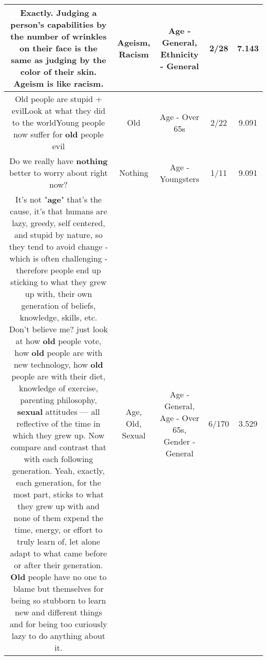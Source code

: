 \documentclass[11pt]{article}
\newlength\mylength
\begin{document}
\begin{center}
\begin{longtable}{|C{.65\mylength}|C{.30\mylength}|C{.12\mylength}|C{.12\mylength}|C{.12\mylength}|}
  \small Exactly.  Judging a person's capabilities by the number of wrinkles on their face is the same as judging by the color of their skin.  \textbf{Ageism} is like \textbf{racism}.\normalsize   & Ageism, Racism & Age - General, Ethnicity - General & 2/28 & 7.143 \\  \hline
  \small Old people are stupid + evilLook at what they did to the worldYoung people now suffer for \textbf{old} people evil\normalsize   & Old & Age - Over 65s & 2/22 & 9.091 \\  \hline
  \small Do we really have \textbf{nothing} better to worry about right now?\normalsize   & Nothing & Age - Youngsters & 1/11 & 9.091 \\  \hline
  \small It's not "\textbf{age}" that's the cause, it's that humans are lazy, greedy, self centered, and stupid by nature, so they tend to avoid change - which is often challenging - therefore people end up sticking to what they grew up with, their own generation of beliefs, knowledge, skills, etc. Don't believe me? just look at how \textbf{old} people vote, how \textbf{old} people are with new technology, how \textbf{old} people are with their diet, knowledge of exercise, parenting philosophy, \textbf{sexual} attitudes --- all reflective of the time in which they grew up. Now compare and contrast that with each following generation. Yeah, exactly, each generation, for the most part, sticks to what they grew up with and none of them expend the time, energy, or effort to truly learn of, let alone adapt to what came before or after their generation. \textbf{Old} people have no one to blame but themselves for being so stubborn to learn new and different things and for being too curiously lazy to do anything about it.\normalsize   & Age, Old, Sexual & Age - General, Age - Over 65s, Gender - General & 6/170 & 3.529 \\  \hline

\end{longtable}
\end{center}
\end{document}
